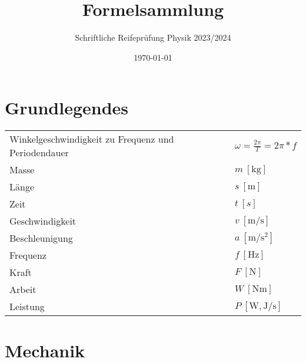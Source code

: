 \documentclass[11pt,a4paper]{paper}
\makeatletter
\newcommand{\mathleft}{\@fleqntrue\@mathmargin0pt}
\makeatother
\begin{document}
\title{Formelsammlung}
\subtitle{Schriftliche Reifeprüfung Physik 2023/2024}
\author{}
\date{\today}
\maketitle
\smalltableofcontents
\mathleft
\section{Grundlegendes}
\begin{tabularx}{\textwidth}{X|X}
	Winkelgeschwindigkeit zu Frequenz und Periodendauer & $\omega = \frac{2\pi}{T}=2\pi*f$ \\
	Masse & $m\: [\unit{\kilo\gram}]$ \\
	Länge & $s\: [\unit{\meter}]$\\
Zeit & $t\:[s]$\\
Geschwindigkeit & $v\:[\unit{\meter\per\second}]$\\
Beschleunigung & $a\:[\unit{\meter\per\second\squared}]$\\
Frequenz & $f\: [\unit{\hertz}]$\\
Kraft & $F\: [\unit{\newton}]$\\
Arbeit & $W \: [\unit{\newton\meter}]$\\
Leistung & $P \: [\unit{\watt},\unit{\joule\per\second}]$
\end{tabularx}

\section{Mechanik}
\mathleft
\end{document}
